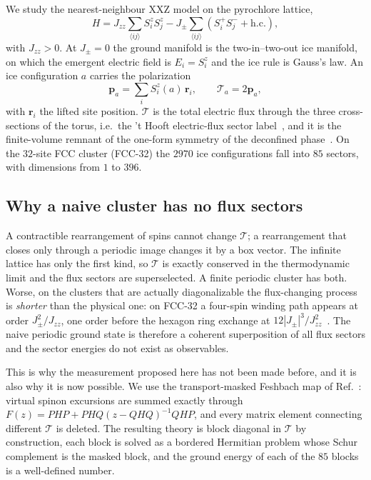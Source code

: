 \documentclass[aps,prb,preprint,amsmath,amssymb,superscriptaddress,
longbibliography,floatfix]{revtex4-2}
\newcommand{\Jzz}{J_{zz}}
\newcommand{\Jpm}{J_{\pm}}
\DeclareRobustCommand{\bT}{\bm{\mathcal T}}
\begin{document}
We study the nearest-neighbour XXZ model on the pyrochlore lattice,
\begin{equation}
 H=\Jzz\sum_{\langle ij\rangle}S^z_iS^z_j
 -\Jpm\sum_{\langle ij\rangle}\left(S^+_iS^-_j+\mathrm{h.c.}\right),
 \label{eq:model}
\end{equation}
with $\Jzz>0$.  At $\Jpm=0$ the ground manifold is the two-in--two-out ice
manifold, on which the emergent electric field is $E_i=S^z_i$ and the ice rule
is Gauss's law.  An ice configuration $a$ carries the polarization
\begin{equation}
 \bm p_a=\sum_{i}S^z_i(a)\,\bm r_i ,\qquad \bT_a=2\bm p_a ,
 \label{eq:pol}
\end{equation}
with $\bm r_i$ the lifted site position.  $\bT$ is the total electric flux
through the three cross-sections of the torus, i.e.\ the 't Hooft electric-flux
sector label~\cite{tHooft1978}, and it is the finite-volume remnant of the
one-form symmetry of the deconfined phase~\cite{Gaiotto2015}.  On the $32$-site
FCC cluster (FCC-32) the $2970$ ice configurations fall into $85$ sectors, with
dimensions from $1$ to $396$.

\subsection{Why a naive cluster has no flux sectors}

A contractible rearrangement of spins cannot change $\bT$; a rearrangement that
closes only through a periodic image changes it by a box vector.  The infinite
lattice has only the first kind, so $\bT$ is exactly conserved in the
thermodynamic limit and the flux sectors are superselected.  A finite periodic
cluster has both.  Worse, on the clusters that are actually diagonalizable the
flux-changing process is \emph{shorter} than the physical one: on FCC-32 a
four-spin winding path appears at order $\Jpm^2/\Jzz$, one order before the
hexagon ring exchange at $12|\Jpm|^3/\Jzz^2$~\cite{ZhouKimMask}.  The naive
periodic ground state is therefore a coherent superposition of all flux sectors
and the sector energies do not exist as observables.

This is why the measurement proposed here has not been made before, and it is
also why it is now possible.  We use the transport-masked Feshbach map of
Ref.~\cite{ZhouKimMask}: virtual spinon excursions are summed exactly through
$F(z)=PHP+PHQ(z-QHQ)^{-1}QHP$, and every matrix element connecting different
$\bT$ is deleted.  The resulting theory is block diagonal in $\bT$ by
construction, each block is solved as a bordered Hermitian problem whose Schur
complement is the masked block, and the ground energy of each of the $85$
blocks is a well-defined number.
\end{document}
